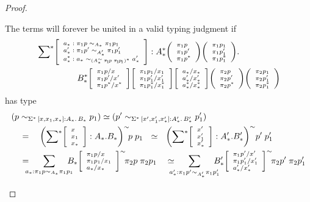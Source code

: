 \documentclass[10pt]{article}
\newcommand{\eq}{\quad=\quad}
\newcommand{\phanq}{\phantom{\eq\qquad}}
\newcommand{\hista}{\!\raisebox{1mm}{${}^*$}}
\newcommand{\eeq}{\simeq}
\newcommand{\trip}[3]{
{\scriptsize \left[
  \begin{array}{l}
    {#1}\\
    {#2}\\
    {#3}
  \end{array}
\right]}}
\newcommand{\tripar}[3]{
{\scriptsize \left(
  \begin{array}{l}
    {#1}\\
    {#2}\\
    {#3}
  \end{array}
\right)}}
\begin{document}
\begin{proof}
\begin{description}
The terms will forever be united in a valid typing judgment if
\begin{align*}
&\sum\hista\trip{a_* : \pi_1 p \sim_{A_*} \pi_1 p_1}
{a'_* : \pi_1 p' \sim_{A'_*}  \pi_1 p'_1}
{a^*_* : a_* \sim_{(A_*^\sim \, \pi\!{}_1\! p\; \pi\!{}_1\! p\!{}_1)^*} a'_*} :
A^*_* \tripar{\pi_1 p}{\pi_1 p'}{\pi_1 p^*}
\tripar{\pi_1 p_1} {\pi_1 p_1'} {\pi_1 p_1^*}.\\
&\phanq B^*_* \trip{\pi_1 p/x}{\pi_1 p'/x'}{\pi_1 p^*/x^*}
\trip{\pi_1 p_1/x_1}{\pi_1 p_1'/x_1'}{\pi_1 p_1^*/x_1^*}
\trip{a_*/x_*}{a_*'/x_*'}{a_*^*/x_*^*}
\tripar{\pi_2 p}{\pi_2 p'}{\pi_2 p^*}
\tripar{\pi_2 p_1}{\pi_2 p_1'}{\pi_2 p_1^*}
\end{align*}
has type
\begin{align*}
&(p \sim_{\Sigma^*\, [x,x_1,x_*] : A_*.\, B_*} p_1) \eeq
    (p' \sim_{\Sigma^*\, [x',x'_1,x'_*] : A'_*.\, B'_*} p'_1)\\
&\eq \left(\sum \hista \trip{x}{x_1}{x_*} : A_*.B_*\right)^\sim \!\!p\; p_1
\ \ \eeq \  \
\left(\sum \hista \trip{x'}{x'_1}{x'_*} : A'_*. B'_*\right)^\sim \!p'\;
p_1'\\
&\eq \hspace{-0.6cm}\sum_{a_* : \pi_1 p \sim_{A_*} \pi_1 p_1} \hspace{-0.3cm} B_*\trip{\pi_1
    p/x}{\pi_1 p_1/x_1}{a_*/x_*}^\sim \!\pi_2 p\;\pi_2 p_1
\quad \eeq \hspace{-0.3cm}
\sum_{a'_* : \pi_1 p' \sim_{A_*'} \pi_1 p'_1} \hspace{-0.3cm} B'_*\trip{\pi_1
  p'/x'}{\pi_1 p'_1/x'_1}{a'_*/x'_*}^\sim \!\pi_2 p'\;\pi_2 p'_1
\end{align*}


\end{description}
\end{proof}
\end{document}

